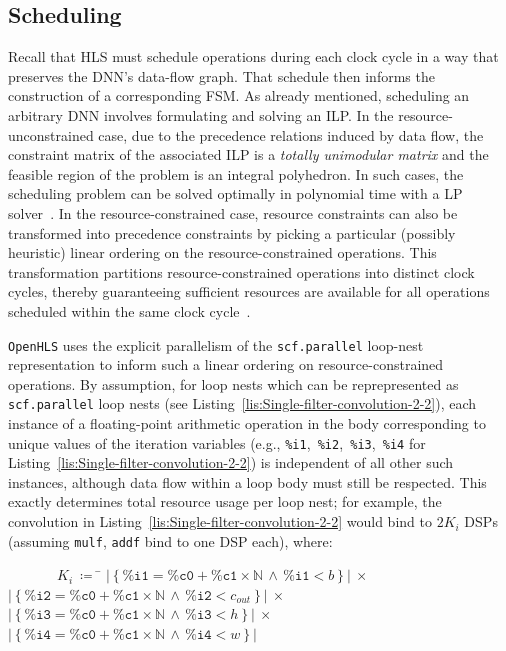 \documentclass[10pt]{sig-alternate}
\begin{document}
\subsection{Scheduling}\label{subsec:Scheduling}

Recall that HLS must schedule operations during each clock cycle in a way that
preserves the DNN's data-flow graph.
That schedule then informs
the construction of a corresponding FSM. As already mentioned, scheduling
an arbitrary DNN involves formulating and solving an ILP.
In the resource-unconstrained
case, due to the precedence relations induced by data flow, the constraint
matrix of the associated ILP is a \emph{totally unimodular matrix}
and the feasible region of the problem is an integral polyhedron.
In such cases, the scheduling problem can be solved optimally
in polynomial time with a LP solver~\cite{tuprints9272}.
In the resource-constrained
case, resource constraints can also be transformed into precedence
constraints by picking a particular (possibly heuristic)
linear ordering on the resource-constrained operations. This transformation
partitions resource-constrained operations into distinct clock cycles,
thereby guaranteeing sufficient resources are available for all operations
scheduled within the same clock cycle~\cite{10.1145/3174243.3174268}.

\texttt{OpenHLS} uses the explicit parallelism of the \texttt{scf.parallel}
loop-nest representation to inform such a linear ordering on resource-constrained
operations. By assumption, for loop nests which can be reprepresented
as \texttt{scf.parallel} loop nests (see Listing~\ref{lis:Single-filter-convolution-2-2}),
each instance of a floating-point arithmetic operation in the body
corresponding to unique values of the iteration variables (e.g., \texttt{\%i1},\texttt{
\%i2},\texttt{ \%i3},\texttt{ \%i4} for Listing~\ref{lis:Single-filter-convolution-2-2})
is independent of all other such instances, although data flow within a loop body must still be respected.
This exactly determines total resource usage per loop nest; for example,
the convolution in Listing~\ref{lis:Single-filter-convolution-2-2}
would bind to $2K_{i}$ DSPs (assuming \texttt{mulf}, \texttt{addf}
bind to one DSP each), where:
\begin{tabbing}
\ \ \ \ \ \ \ $K_{i}\   \coloneqq$ \= $\left|\left\{ \texttt{\%i1}=\texttt{\%c0}+\texttt{\%c1}\times\mathbb{N}\,\wedge\,\texttt{\%i1}<b\right\} \right|\ \times$\\
\>$\left|\left\{ \texttt{\%i2}=\texttt{\%c0}+\texttt{\%c1}\times\mathbb{N}\,\wedge\,\texttt{\%i2}<c_{out}\right\} \right|\ \times$\\
\>$\left|\left\{ \texttt{\%i3}=\texttt{\%c0}+\texttt{\%c1}\times\mathbb{N}\,\wedge\,\texttt{\%i3}<h\right\} \right|\ \times$\\
\>$\left|\left\{ \texttt{\%i4}=\texttt{\%c0}+\texttt{\%c1}\times\mathbb{N}\,\wedge\,\texttt{\%i4}<w\right\} \right|$
\end{tabbing}
\end{document}
